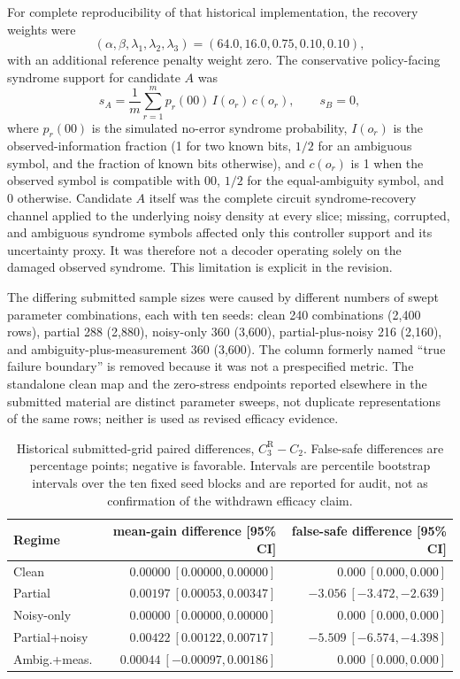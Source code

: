 \documentclass[11pt]{article}
\numberwithin{equation}{section}
\begin{document}
For complete reproducibility of that historical implementation, the recovery
weights were
\begin{equation}
(\alpha,\beta,\lambda_1,\lambda_2,\lambda_3)
=(64.0,16.0,0.75,0.10,0.10),
\end{equation}
with an additional reference penalty weight zero.  The conservative
policy-facing syndrome support for candidate $A$ was
\begin{equation}
s_A=\frac{1}{m}\sum_{r=1}^{m}p_r(00)\,I(o_r)\,c(o_r),
\qquad s_B=0,
\label{eq:submitted-support}
\end{equation}
where $p_r(00)$ is the simulated no-error syndrome probability, $I(o_r)$ is the
observed-information fraction (1 for two known bits, $1/2$ for an ambiguous
symbol, and the fraction of known bits otherwise), and $c(o_r)$ is 1 when the
observed symbol is compatible with $00$, $1/2$ for the equal-ambiguity symbol,
and 0 otherwise.  Candidate $A$ itself was the complete circuit syndrome-recovery
channel applied to the underlying noisy density at every slice; missing,
corrupted, and ambiguous syndrome symbols affected only this controller support
and its uncertainty proxy.  It was therefore not a decoder operating solely on
the damaged observed syndrome.  This limitation is explicit in the revision.

The differing submitted sample sizes were caused by different numbers of swept
parameter combinations, each with ten seeds: clean 240 combinations (2,400 rows),
partial 288 (2,880), noisy-only 360 (3,600), partial-plus-noisy 216 (2,160), and
ambiguity-plus-measurement 360 (3,600).  The column formerly named ``true failure
boundary'' is removed because it was not a prespecified metric.  The standalone
clean map and the zero-stress endpoints reported elsewhere in the submitted
material are distinct parameter sweeps, not duplicate representations of the
same rows; neither is used as revised efficacy evidence.

\begin{table}[ht]
\centering
\scriptsize
\caption{Historical submitted-grid paired differences, $C_3^{\mathrm R}-C_2$.
False-safe differences are percentage points; negative is favorable.  Intervals
are percentile bootstrap intervals over the ten fixed seed blocks and are
reported for audit, not as confirmation of the withdrawn efficacy claim.}
\label{tab:submitted-bootstrap}
\begin{tabular}{@{}lrr@{}}
\toprule
Regime & mean-gain difference [95\% CI] & false-safe difference [95\% CI] \\
\midrule
Clean & $0.00000\ [0.00000,0.00000]$ & $0.000\ [0.000,0.000]$ \\
Partial & $0.00197\ [0.00053,0.00347]$ & $-3.056\ [-3.472,-2.639]$ \\
Noisy-only & $0.00000\ [0.00000,0.00000]$ & $0.000\ [0.000,0.000]$ \\
Partial+noisy & $0.00422\ [0.00122,0.00717]$ & $-5.509\ [-6.574,-4.398]$ \\
Ambig.+meas. & $0.00044\ [-0.00097,0.00186]$ & $0.000\ [0.000,0.000]$ \\
\bottomrule
\end{tabular}
\end{table}
\end{document}
